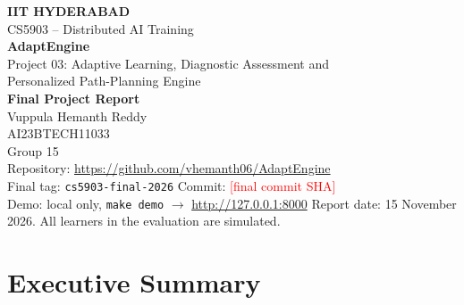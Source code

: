 \documentclass[11pt,a4paper]{article}
\newcommand{\fillin}[1]{\textcolor{red}{[#1]}}
\newcommand{\finaltag}{cs5903-final-2026}
\begin{document}
\begin{titlepage}
\centering
\vspace*{1.5cm}
{\Large \textbf{IIT HYDERABAD}}\\[0.4cm]
{\large CS5903 -- Distributed AI Training}\\[1.5cm]
{\Huge \textbf{AdaptEngine}}\\[0.5cm]
{\Large Project 03: Adaptive Learning, Diagnostic Assessment and\\ Personalized Path-Planning Engine}\\[1.5cm]
{\LARGE \textbf{Final Project Report}}\\[1.5cm]
{\large Vuppula Hemanth Reddy\\[0.2cm]
AI23BTECH11033\\[0.2cm]
Group 15}\\[1.5cm]
{\large Repository: \url{https://github.com/vhemanth06/AdaptEngine}}\\[0.3cm]
{\large Final tag: \texttt{\finaltag} \quad Commit: \fillin{final commit SHA}}\\[0.3cm]
{\large Demo: local only, \texttt{make demo} $\rightarrow$ \url{http://127.0.0.1:8000}}
\vfill
{\small Report date: 15 November 2026. All learners in the evaluation are simulated.}
\end{titlepage}

\section*{Executive Summary}
\end{document}
